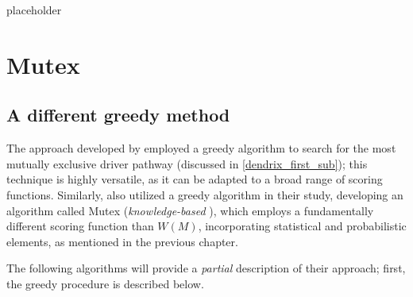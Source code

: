 placeholder 

\section{Mutex}

\subsection{A different greedy method}

The approach developed by \textcite{dendrix} employed a greedy algorithm to search for the most mutually exclusive driver pathway (discussed in \cref{dendrix_first_sub}); this technique is highly versatile, as it can be adapted to a broad range of scoring functions. Similarly, \textcite{mutex} also utilized a greedy algorithm in their study, developing an algorithm called Mutex (\textit{knowledge-based} \cite{survey}), which employs a fundamentally different scoring function than $W(M)$, incorporating statistical and probabilistic elements, as mentioned in the previous chapter.

The following algorithms will provide a \textit{partial} description of their approach; first, the greedy procedure is described below.

%

